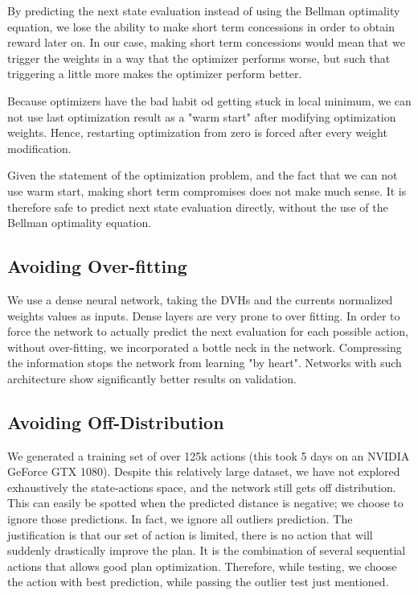 By predicting the next state evaluation instead of using the Bellman optimality equation, we lose the ability to make short term concessions in order to obtain reward later on.
In our case, making short term concessions would mean that we trigger the weights in a way that the optimizer performs worse, but such that triggering a little more makes the optimizer perform better.

Because optimizers have the bad habit od getting stuck in local minimum, we can not use last optimization result as a "warm start" after modifying optimization weights.
Hence, restarting optimization from zero is forced after every weight modification.

Given the statement of the optimization problem, and the fact that we can not use warm start, making short term compromises does not make much sense.
It is therefore safe to predict next state evaluation directly, without the use of the Bellman optimality equation.

\subsection{Avoiding Over-fitting}
We use a dense neural network, taking the DVHs and the currents normalized weights values as inputs.
Dense layers are very prone to over fitting.
In order to force the network to actually predict the next evaluation for each possible action, without over-fitting, we incorporated a bottle neck in the network.
Compressing the information stops the network from learning "by heart".
Networks with such architecture show significantly better results on validation.

\subsection{Avoiding Off-Distribution}
We generated a training set of over 125k actions (this took 5 days on an NVIDIA GeForce GTX 1080).
Despite this relatively large dataset, we have not explored exhaustively the state-actions space, and the network still gets off distribution.
This can easily be spotted when the predicted distance is negative; we choose to ignore those predictions.
In fact, we ignore all outliers prediction.
The justification is that our set of action is limited, there is no action that will suddenly drastically improve the plan.
It is the combination of several sequential actions that allows good plan optimization.
Therefore, while testing, we choose the action with best prediction, while passing the outlier test just mentioned.

